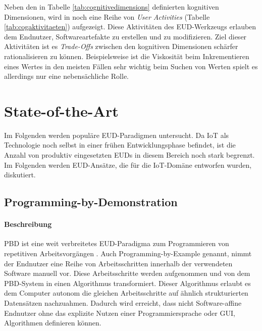 Neben den in Tabelle \ref{tab:cognitivedimensions} definierten kognitiven Dimensionen, wird in \cite{green2000instructions} noch eine Reihe von \textit{User Activities} (Tabelle \ref{tab:cogaktivitaeten}) aufgezeigt. Diese Aktivitäten des \ac{EUD}-Werkzeugs erlauben dem Endnutzer, Softwareartefakte zu erstellen und zu modifizieren. Ziel dieser Aktivitäten ist es \textit{Trade-Offs} zwischen den kognitiven Dimensionen schärfer rationalisieren zu können. Beispielsweise ist die Viskosität beim Inkrementieren eines Wertes in den meisten Fällen sehr wichtig beim Suchen von Werten spielt es allerdings nur eine nebensächliche Rolle. 

\section{State-of-the-Art}\label{subsec:stateoftheart}
Im Folgenden werden populäre \ac{EUD}-Paradigmen untersucht. Da \ac{IoT} als Technologie noch selbst in einer frühen Entwicklungsphase befindet, ist die Anzahl von produktiv eingesetzten \acp{EUD} in diesem Bereich noch stark begrenzt. Im Folgenden werden \ac{EUD}-Ansätze, die für die \ac{IoT}-Domäne entworfen wurden, diskutiert.

\subsection{Programming-by-Demonstration}
\paragraph{Beschreibung} \acf{PBD} ist eine weit verbreitetes \ac{EUD}-Paradigma zum Programmieren von repetitiven Arbeitsvorgängen \cite{cypher1993pbd}. Auch Programming-by-Example genannt, nimmt der Endnutzer eine Reihe von Arbeitsschritten innerhalb der verwendeten Software manuell vor. Diese Arbeitsschritte werden aufgenommen und von dem \ac{PBD}-System in einen Algorithmus transformiert. Dieser Algorithmus erlaubt es dem Computer autonom die gleichen Arbeitsschritte auf ähnlich strukturierten Datensätzen nachzuahmen. Dadurch wird erreicht, dass nicht Software-affine Endnutzer ohne das explizite Nutzen einer Programmiersprache oder \ac{GUI}, Algorithmen definieren können.


